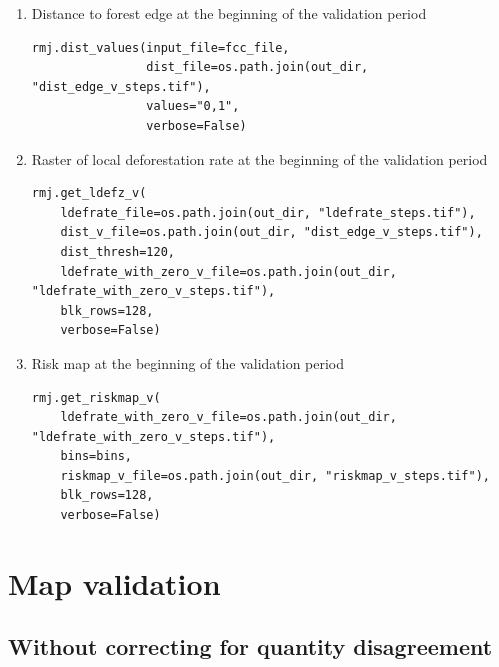 \documentclass[paper=a4, 12pt, DIV=12]{scrartcl}
\begin{document}
\begin{enumerate}
\item Distance to forest edge at the beginning of the validation period
\label{sec:org990bddc}

\begin{verbatim}
rmj.dist_values(input_file=fcc_file,
                dist_file=os.path.join(out_dir, "dist_edge_v_steps.tif"),
                values="0,1",
                verbose=False)
\end{verbatim}

\item Raster of local deforestation rate at the beginning of the validation period
\label{sec:orga539e4f}

\begin{verbatim}
rmj.get_ldefz_v(
    ldefrate_file=os.path.join(out_dir, "ldefrate_steps.tif"),
    dist_v_file=os.path.join(out_dir, "dist_edge_v_steps.tif"),
    dist_thresh=120,
    ldefrate_with_zero_v_file=os.path.join(out_dir, "ldefrate_with_zero_v_steps.tif"),
    blk_rows=128,
    verbose=False)
\end{verbatim}

\item Risk map at the beginning of the validation period
\label{sec:orgd3d612c}

\begin{verbatim}
rmj.get_riskmap_v(
    ldefrate_with_zero_v_file=os.path.join(out_dir, "ldefrate_with_zero_v_steps.tif"),
    bins=bins,  
    riskmap_v_file=os.path.join(out_dir, "riskmap_v_steps.tif"),
    blk_rows=128,
    verbose=False)
\end{verbatim}
\end{enumerate}


\section{Map validation}
\label{sec:org533dc1a}

\subsection{Without correcting for quantity disagreement}
\label{sec:org22321a5}
\end{document}
